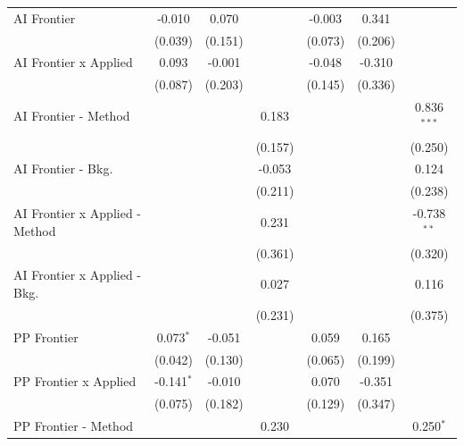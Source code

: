 \begin{tabular}{lcccccc}
   AI Frontier                    & -0.010       & 0.070        &               & -0.003  & 0.341         &   \\   
                                  & (0.039)      & (0.151)      &               & (0.073) & (0.206)       &   \\   
   AI Frontier x Applied          & 0.093        & -0.001       &               & -0.048  & -0.310        &   \\   
                                  & (0.087)      & (0.203)      &               & (0.145) & (0.336)       &   \\   
   AI Frontier - Method           &              &              & 0.183         &         &               & 0.836$^{***}$\\   
                                  &              &              & (0.157)       &         &               & (0.250)\\   
   AI Frontier - Bkg.             &              &              & -0.053        &         &               & 0.124\\   
                                  &              &              & (0.211)       &         &               & (0.238)\\   
   AI Frontier x Applied - Method &              &              & 0.231         &         &               & -0.738$^{**}$\\   
                                  &              &              & (0.361)       &         &               & (0.320)\\   
   AI Frontier x Applied - Bkg.   &              &              & 0.027         &         &               & 0.116\\   
                                  &              &              & (0.231)       &         &               & (0.375)\\   
   PP Frontier                    & 0.073$^{*}$  & -0.051       &               & 0.059   & 0.165         &   \\   
                                  & (0.042)      & (0.130)      &               & (0.065) & (0.199)       &   \\   
   PP Frontier x Applied          & -0.141$^{*}$ & -0.010       &               & 0.070   & -0.351        &   \\   
                                  & (0.075)      & (0.182)      &               & (0.129) & (0.347)       &   \\   
   PP Frontier - Method           &              &              & 0.230         &         &               & 0.250$^{*}$\\   

\end{tabular}

